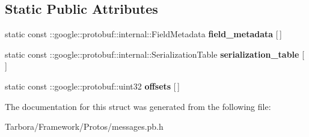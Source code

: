 \subsection*{Static Public Attributes}
\begin{DoxyCompactItemize}
\item 
\mbox{\label{structTableStruct__messages__2eproto_aad12319385c1b68866d27b6a31b6da9b}} 
static const \+::google\+::protobuf\+::internal\+::\+Field\+Metadata {\bfseries field\+\_\+metadata} \mbox{[}$\,$\mbox{]}
\item 
\mbox{\label{structTableStruct__messages__2eproto_a9a6112ee579f4ce5dc5bc6576ced8f3d}} 
static const \+::google\+::protobuf\+::internal\+::\+Serialization\+Table {\bfseries serialization\+\_\+table} \mbox{[}$\,$\mbox{]}
\item 
\mbox{\label{structTableStruct__messages__2eproto_a278ec70cc6acd8eae72f0ca16c34ff11}} 
static const \+::google\+::protobuf\+::uint32 {\bfseries offsets} \mbox{[}$\,$\mbox{]}
\end{DoxyCompactItemize}


The documentation for this struct was generated from the following file\+:\begin{DoxyCompactItemize}
\item 
Tarbora/\+Framework/\+Protos/messages.\+pb.\+h\end{DoxyCompactItemize}
